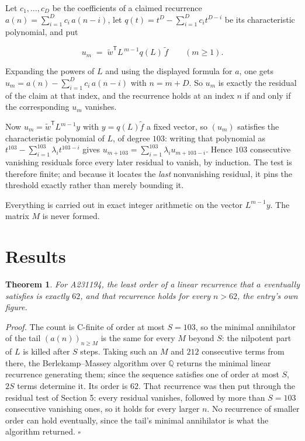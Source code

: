\documentclass[11pt]{article}
\newtheorem{theorem}{Theorem}
\theoremstyle{definition}
\begin{document}
Let $c_1,\dots,c_D$ be the coefficients of a claimed recurrence $a(n) = \sum_{i=1}^{D} c_i\,a(n-i)$, let $q(t) = t^{D} - \sum_{i=1}^{D} c_i t^{D-i}$ be its characteristic polynomial, and put

\[u_m \;=\; \tilde w^{\mathsf T} L^{\,m-1} q(L)\,\tilde f \qquad (m \ge 1).\]

Expanding the powers of $L$ and using the displayed formula for $a$, one gets $u_m = a(n) - \sum_{i=1}^{D} c_i\,a(n-i)$ with $n = m + D$. So $u_m$ is exactly the residual of the claim at that index, and the recurrence holds at an index $n$ if and only if the corresponding $u_m$ vanishes.

Now $u_m = \tilde w^{\mathsf T} L^{m-1} y$ with $y = q(L)\tilde f$ a fixed vector, so $(u_m)$ satisfies the characteristic polynomial of $L$, of degree $103$: writing that polynomial as $t^{103} - \sum_{i=1}^{103} \lambda_i t^{103-i}$ gives $u_{m+103} = \sum_{i=1}^{103} \lambda_i u_{m+103-i}$. Hence $103$ consecutive vanishing residuals force every later residual to vanish, by induction. The test is therefore finite; and because it locates the {\itshape last} nonvanishing residual, it pins the threshold exactly rather than merely bounding it.

Everything is carried out in exact integer arithmetic on the vector $L^{m-1}y$. The matrix $M$ is never formed.

\section{Results}

\begin{theorem} For A231194, the least order of a linear recurrence that $a$ eventually satisfies is exactly $62$, and that recurrence holds for every $n > 62$, the entry's own figure.\end{theorem}

{\itshape Proof.} The count is C-finite of order at most $S = 103$, so the minimal annihilator of the tail $(a(n))_{n \ge M}$ is the same for every $M$ beyond $S$: the nilpotent part of $L$ is killed after $S$ steps. Taking such an $M$ and $212$ consecutive terms from there, the Berlekamp--Massey algorithm over $\mathbb{Q}$ returns the minimal linear recurrence generating them; since the sequence satisfies one of order at most $S$, $2S$ terms determine it. Its order is $62$. That recurrence was then put through the residual test of Section 5: every residual vanishes, followed by more than $S = 103$ consecutive vanishing ones, so it holds for every larger $n$. No recurrence of smaller order can hold eventually, since the tail's minimal annihilator is what the algorithm returned. $\square$
\end{document}
